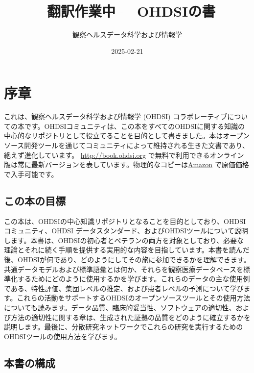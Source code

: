 \documentclass[
  11pt]{book}
\title{--翻訳作業中--　OHDSIの書}
\author{観察ヘルスデータ科学および情報学}
\date{2025-02-21}
\theoremstyle{definition}
\theoremstyle{definition}
\theoremstyle{definition}
\theoremstyle{definition}
\theoremstyle{remark}
\begin{document}
\maketitle

{
\setcounter{tocdepth}{1}
\tableofcontents
}
\chapter*{序章}\label{ux5e8fux7ae0}

これは、観察ヘルスデータ科学および情報学 (OHDSI) コラボレーティブについての本です。OHDSIコミュニティは、この本をすべてのOHDSIに関する知識の中心的なリポジトリとして役立てることを目的として書きました。本はオープンソース開発ツールを通じてコミュニティによって維持される生きた文書であり、絶えず進化しています。 \url{http://book.ohdsi.org} で無料で利用できるオンライン版は常に最新バージョンを表しています。物理的なコピーは\href{https://www.amazon.com/OHDSI-Observational-Health-Sciences-Informatics/dp/1088855199}{Amazon} で原価価格で入手可能です。

\section*{この本の目標}\label{ux3053ux306eux672cux306eux76eeux6a19}

この本は、OHDSIの中心知識リポジトリとなることを目的としており、OHDSIコミュニティ、OHDSI データスタンダード、およびOHDSIツールについて説明します。本書は、OHDSIの初心者とベテランの両方を対象としており、必要な理論とそれに続く手順を提供する実用的な内容を目指しています。本書を読んだ後、OHDSIが何であり、どのようにしてその旅に参加できるかを理解できます。共通データモデルおよび標準語彙とは何か、それらを観察医療データベースを標準化するためにどのように使用するかを学びます。これらのデータの主な使用例である、特性評価、集団レベルの推定、および患者レベルの予測について学びます。これらの活動をサポートするOHDSIのオープンソースツールとその使用方法についても読みます。データ品質、臨床的妥当性、ソフトウェアの適切性、および方法の適切性に関する章は、生成された証拠の品質をどのように確立するかを説明します。最後に、分散研究ネットワークでこれらの研究を実行するためのOHDSIツールの使用方法を学びます。

\section*{本書の構成}\label{ux672cux66f8ux306eux69cbux6210}
\end{document}

